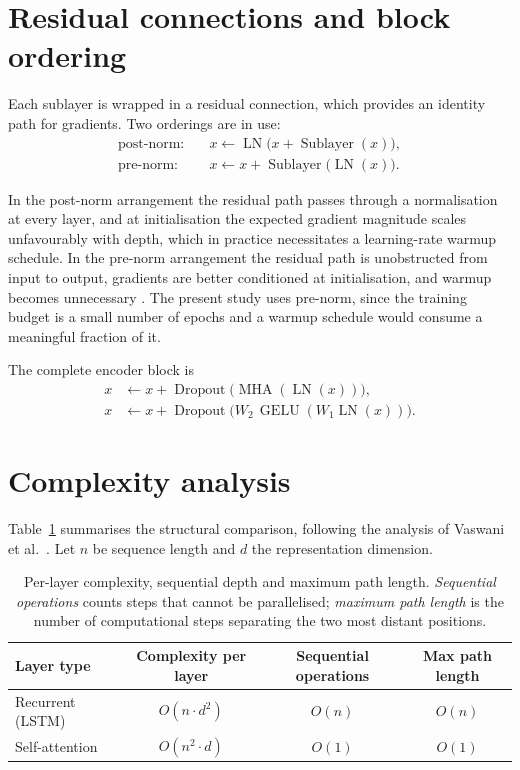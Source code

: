\section{Residual connections and block ordering}

Each sublayer is wrapped in a residual connection, which provides an identity path for gradients.
Two orderings are in use:
\begin{align}
\text{post-norm:}\quad & x \leftarrow \operatorname{LN}\!\big(x + \operatorname{Sublayer}(x)\big), \\
\text{pre-norm:}\quad  & x \leftarrow x + \operatorname{Sublayer}\!\big(\operatorname{LN}(x)\big).
\end{align}

In the post-norm arrangement the residual path passes through a normalisation at every layer, and
at initialisation the expected gradient magnitude scales unfavourably with depth, which in practice
necessitates a learning-rate warmup schedule. In the pre-norm arrangement the residual path is
unobstructed from input to output, gradients are better conditioned at initialisation, and warmup
becomes unnecessary \cite{xiong2020}. The present study uses pre-norm, since the training budget
is a small number of epochs and a warmup schedule would consume a meaningful fraction of it.

The complete encoder block is
\begin{align}
x &\leftarrow x + \operatorname{Dropout}\big(\operatorname{MHA}(\operatorname{LN}(x))\big), \\
x &\leftarrow x + \operatorname{Dropout}\big(W_2\,\operatorname{GELU}(W_1 \operatorname{LN}(x))\big).
\end{align}

\section{Complexity analysis}

Table~\ref{tab:complexity} summarises the structural comparison, following the analysis of
Vaswani et al.\ \cite{vaswani2017}. Let $n$ be sequence length and $d$ the representation
dimension.

\begin{table}[ht]
\centering
\caption[Complexity comparison of recurrent and self-attentive layers]{Per-layer complexity,
sequential depth and maximum path length. \emph{Sequential operations} counts steps that cannot be
parallelised; \emph{maximum path length} is the number of computational steps separating the two
most distant positions.}
\label{tab:complexity}
\begin{tabular}{lccc}
\toprule
\textbf{Layer type} & \textbf{Complexity per layer} & \textbf{Sequential operations} & \textbf{Max path length} \\
\midrule
Recurrent (LSTM)    & $O(n \cdot d^2)$ & $O(n)$ & $O(n)$ \\
Self-attention      & $O(n^2 \cdot d)$ & $O(1)$ & $O(1)$ \\
\bottomrule
\end{tabular}
\end{table}


